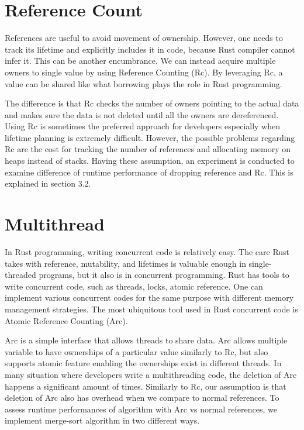 \section{Reference Count}
\label{sec:concept_refcount}
References are useful to avoid movement of ownership. However, one needs to track its lifetime and explicitly includes it in code, 
because Rust compiler cannot infer it. This can be another encumbrance. We can instead acquire multiple owners to single value by using Reference Counting (Rc). 
By leveraging Rc, a value can be shared like what borrowing plays the role in Rust programming. 

The difference is that Rc checks the number of owners pointing to the actual data and makes sure the data is not deleted 
until all the owners are dereferenced. Using Rc is sometimes the preferred approach for developers especially when lifetime planning is extremely difficult.
However, the possible problems regarding Rc are the cost for tracking the number of references and allocating memory on heaps instead of stacks.
Having these assumption, an experiment is conducted to examine difference of runtime performance of dropping reference and Rc. 
This is explained in section 3.2.

\section{Multithread}
\label{sec:concenpt_multithreading}
In Rust programming, writing concurrent code is relatively easy. The care Rust takes with reference, mutability, and lifetimes is valuable enough in single-threaded programs, 
but it also is in concurrent programming. Rust has tools to write concurrent code, such as threads, locks, atomic reference. 
One can implement various concurrent codes for the same purpose with different memory management strategies. 
The most ubiquitous tool used in Rust concurrent code is Atomic Reference Counting (Arc). 

Arc is a simple interface that allows threads to share data. Arc allows multiple variable to have ownerships of a particular value similarly to Rc, 
but also supports atomic feature enabling the ownerships exist in different threads. 
In many situation where developers write a multithreading code, the deletion of Arc happens a significant amount of times. 
Similarly to Rc, our assumption is that deletion of Arc also has overhead when we compare to normal references. 
To assess runtime performances of algorithm with Arc vs normal references, we implement merge-sort algorithm in two different ways. 

